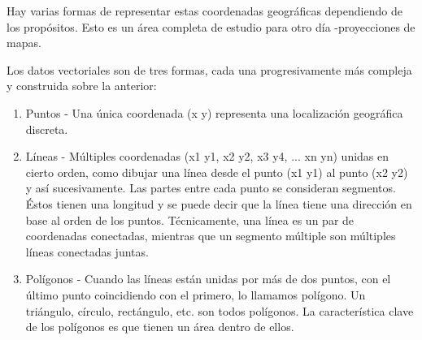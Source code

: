 Hay varias formas de representar estas coordenadas geográficas dependiendo de 
los propósitos. Esto es un área completa de estudio para otro día 
-proyecciones de mapas.

Los datos vectoriales son de tres formas, cada una progresivamente más compleja y
construida sobre la anterior:

\begin{enumerate}
\item Puntos - Una única coordenada (x y) representa una localización 
geográfica discreta.
\item Líneas - Múltiples coordenadas (x1 y1, x2 y2, x3 y4, ... xn yn) unidas 
en cierto orden, como dibujar una línea desde el punto (x1 y1) al punto (x2 y2)
y así sucesivamente. Las partes entre cada punto se consideran segmentos. 
Éstos tienen una longitud y se puede decir que la línea tiene una dirección
en base al orden de los puntos.
Técnicamente, una línea es un par de coordenadas conectadas, mientras que un 
segmento múltiple son múltiples líneas conectadas juntas.
\item Polígonos - Cuando las líneas están unidas por más de dos puntos, con el 
último punto coincidiendo con el primero, lo llamamos polígono.
Un triángulo, círculo, rectángulo, etc. son todos polígonos. La característica 
clave de los polígonos es que tienen un área dentro de ellos.
\end{enumerate}

